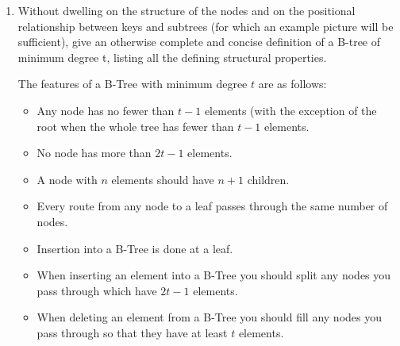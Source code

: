 \documentclass[10pt,\jkfside,a4paper]{article}
\begin{document}
\begin{enumerate}

\item Without dwelling on the structure of the nodes and on the positional relationship between keys 
and subtrees (for which an example picture will be sufficient), give an otherwise complete and concise 
definition of a B-tree of minimum degree t, listing all the defining structural properties.

The features of a B-Tree with minimum degree $t$ are as follows:

\begin{itemize}

\item Any node has no fewer than $t - 1$ elements (with the exception of the root when the whole tree has 
fewer than $t - 1$ elements.

\item No node has more than $2t - 1$ elements.

\item A node with $n$ elements should have $n + 1$ children.

\item Every route from any node to a leaf passes through the same number of nodes.

\item Insertion into a B-Tree is done at a leaf.

\item When inserting an element into a B-Tree you should split any nodes you pass through which have $2t - 1$ 
elements.

\item When deleting an element from a B-Tree you should fill any nodes you pass through so that they have at least 
$t$ elements.

\end{itemize}


\end{enumerate}
\end{document}
